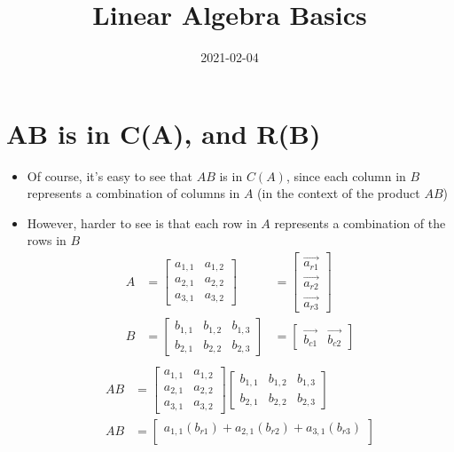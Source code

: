 \documentclass{article}
\title{Linear Algebra Basics}
\date{2021-02-04}
\begin{document}
\maketitle
\section{AB is in C(A), and R(B)}
\begin{itemize}
  \item Of course, it's easy to see that $AB$ is in $C(A)$, since each column
    in $B$ represents a combination of columns in $A$ (in the context of the
    product $AB$)
  \item However, harder to see is that each row in $A$ represents a combination
    of the rows in $B$
  \begin{align*}
    A&=
    \begin{bmatrix}
      a_{1,1}&a_{1,2}\\
      a_{2,1}&a_{2,2}\\
      a_{3,1}&a_{3,2}
    \end{bmatrix}
    &=
    \begin{bmatrix}
      \vec{a_{r1}}\\
      \vec{a_{r2}}\\
      \vec{a_{r3}}
    \end{bmatrix}\\
    B&=
    \begin{bmatrix}
      b_{1,1}&b_{1,2}&b_{1,3}\\
      b_{2,1}&b_{2,2}&b_{2,3}
    \end{bmatrix}
    &=
    \begin{bmatrix}
      \vec{b_{c1}}&\vec{b_{c2}}
    \end{bmatrix}\\
  \end{align*}
  \begin{align}
    AB&=\nonumber
    \begin{bmatrix}
      a_{1,1}&a_{1,2}\\
      a_{2,1}&a_{2,2}\\
      a_{3,1}&a_{3,2}
    \end{bmatrix}
    \begin{bmatrix}
      b_{1,1}&b_{1,2}&b_{1,3}\\
      b_{2,1}&b_{2,2}&b_{2,3}
    \end{bmatrix}\\
    AB&=
    \begin{bmatrix}
      a_{1,1}(b_{r1})+a_{2,1}(b_{r2})+a_{3,1}(b_{r3})\\

\end{bmatrix}
\end{align}
\end{itemize}
\end{document}
